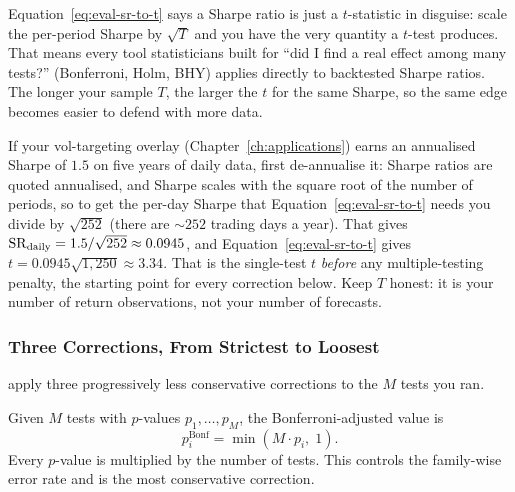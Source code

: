 \begin{intuition}
Equation~\eqref{eq:eval-sr-to-t} says a Sharpe ratio is just a $t$-statistic in disguise: scale the per-period Sharpe by $\sqrt{T}$ and you have the very quantity a $t$-test produces.
That means every tool statisticians built for ``did I find a real effect among many tests?'' (Bonferroni, Holm, BHY) applies directly to backtested Sharpe ratios.
The longer your sample $T$, the larger the $t$ for the same Sharpe, so the same edge becomes easier to defend with more data.
\end{intuition}

\begin{projectconnection}
If your vol-targeting overlay (Chapter~\ref{ch:applications}) earns an annualised Sharpe of $1.5$ on five years of daily data, first de-annualise it: Sharpe ratios are quoted annualised, and Sharpe scales with the square root of the number of periods, so to get the per-day Sharpe that Equation~\eqref{eq:eval-sr-to-t} needs you divide by $\sqrt{252}$ (there are ${\sim}252$ trading days a year). That gives $\operatorname{SR}_{\text{daily}} = 1.5/\sqrt{252} \approx 0.0945$, and Equation~\eqref{eq:eval-sr-to-t} gives $t = 0.0945\sqrt{1{,}250} \approx 3.34$.
That is the single-test $t$ \emph{before} any multiple-testing penalty, the starting point for every correction below.
Keep $T$ honest: it is your number of return observations, not your number of forecasts.
\end{projectconnection}

\subsubsection{Three Corrections, From Strictest to Loosest}

\citet{HarveyLiu2015} apply three progressively less conservative corrections to the $M$ tests you ran.

\begin{definition}
Given $M$ tests with $p$-values $p_1,\ldots,p_M$, the Bonferroni-adjusted value is
\begin{equation}
\label{eq:eval-bonferroni}
p_i^{\text{Bonf}} = \min(M \cdot p_i,\; 1).
\end{equation}
Every $p$-value is multiplied by the number of tests. This controls the family-wise error rate and is the most conservative correction.
\end{definition}

